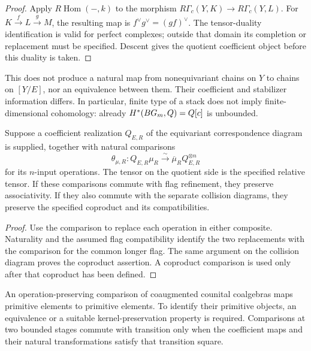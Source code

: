 \begin{proof}
Apply $R\operatorname{Hom}(-,k)$ to the morphism
$R\Gamma_c(Y,K)\to R\Gamma_c(Y,L)$.
For $K\xrightarrow fL\xrightarrow gM$, the resulting map is
$f^\vee g^\vee=(gf)^\vee$. The tensor-duality identification is
valid for perfect complexes; outside that domain its completion
or replacement must be specified. Descent gives the quotient
coefficient object before this duality is taken.
\end{proof}

This does not produce a natural map from nonequivariant chains on
$Y$ to chains on $[Y/E]$, nor an equivalence between them. Their
coefficient and stabilizer information differs. In particular,
finite type of a stack does not imply finite-dimensional
cohomology: already $H^*(BG_m,Q)=Q[c]$ is unbounded.

\begin{proposition}
\label{prop:quotient-after-correspondence-theta-mu-comparison}
\label{prop:quotient-after-correspondence-theta-mu-associativity}
\label{prop:quotient-after-correspondence-theta-mu-coproduct}
Suppose a coefficient realization $Q_{E,R}$ of the equivariant
correspondence diagram is supplied, together with natural
comparisons
\[
 \theta_{\mu,R}:Q_{E,R}\mu_R
       \xrightarrow{\ \sim\ }\overline\mu_RQ_{E,R}^{\otimes n}
\]
for its $n$-input operations. The tensor on the quotient side is
the specified relative tensor. If these comparisons commute with
flag refinement, they preserve associativity. If they also
commute with the separate collision diagrams, they preserve the
specified coproduct and its compatibilities.
\end{proposition}

\begin{proof}
Use the comparison to replace each operation in either composite.
Naturality and the assumed flag compatibility identify the two
replacements with the comparison for the common longer flag.
The same argument on the collision diagram proves the coproduct
assertion. A coproduct comparison is used only after that
coproduct has been defined.
\end{proof}

\begin{proposition}
\label{prop:quotient-after-correspondence-theta-mu-primitives}
\label{prop:quotient-after-correspondence-hn-transition-compatibility}
An operation-preserving comparison of coaugmented counital
coalgebras maps primitive elements to primitive elements. To
identify their primitive objects, an equivalence or a suitable
kernel-preservation property is required. Comparisons at two
bounded stages commute with transition only when the coefficient
maps and their natural transformations satisfy that transition
square.
\end{proposition}

